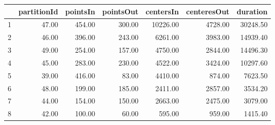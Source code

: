 \begin{table}[ht]
\centering
\begin{tabular}{rrrrrrr}
  \hline
 & partitionId & pointsIn & pointsOut & centersIn & centeresOut & duration \\ 
  \hline
1 & 47.00 & 454.00 & 300.00 & 10226.00 & 4728.00 & 30248.50 \\ 
  2 & 46.00 & 396.00 & 243.00 & 6261.00 & 3983.00 & 14939.40 \\ 
  3 & 49.00 & 254.00 & 157.00 & 4750.00 & 2844.00 & 14496.30 \\ 
  4 & 45.00 & 283.00 & 230.00 & 4522.00 & 3424.00 & 10297.60 \\ 
  5 & 39.00 & 416.00 & 83.00 & 4410.00 & 874.00 & 7623.50 \\ 
  6 & 48.00 & 199.00 & 185.00 & 2411.00 & 2857.00 & 3534.20 \\ 
  7 & 44.00 & 154.00 & 150.00 & 2663.00 & 2475.00 & 3079.00 \\ 
  8 & 42.00 & 100.00 & 60.00 & 595.00 & 959.00 & 1415.40 \\ 
   \hline
\end{tabular}
\end{table}
